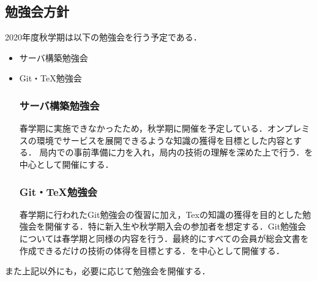 \subsection*{勉強会方針}


2020年度秋学期は以下の勉強会を行う予定である．
\begin{itemize}
    \item サーバ構築勉強会
\item Git・TeX勉強会

    \subsubsection*{サーバ構築勉強会}
    春学期に実施できなかったため，秋学期に開催を予定している．オンプレミスの環境でサービスを展開できるような知識の獲得を目標とした内容とする．
		局内での事前準備に力を入れ，局内の技術の理解を深めた上で行う．\secondGrade{}を中心として開催にする．
\subsubsection*{Git・TeX勉強会}
    春学期に行われたGit勉強会の復習に加え，Texの知識の獲得を目的とした勉強会を開催する．特に新入生や秋学期入会の参加者を想定する．Git勉強会については春学期と同様の内容を行う．最終的にすべての会員が総会文書を作成できるだけの技術の体得を目標とする．\secondGrade{}を中心として開催する．
\end{itemize}
また上記以外にも，必要に応じて勉強会を開催する．
